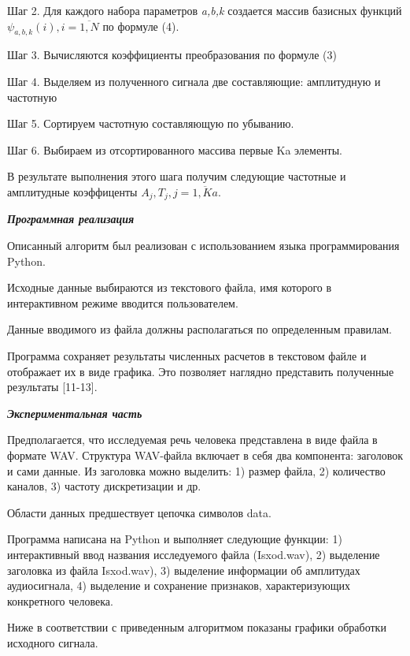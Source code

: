 \begin{multicols}{2}
Шаг 2. Для каждого набора параметров \emph{a,b,k} создается массив
базисных функций $\psi_{a,b,k}(i),i=\overline{1,N}$ по формуле (4).

Шаг 3. Вычисляются коэффициенты преобразования по формуле (3)

Шаг 4. Выделяем из полученного сигнала две составляющие: амплитудную и
частотную

Шаг 5. Сортируем частотную составляющую по убыванию.

Шаг 6. Выбираем из отсортированного массива первые Ka элементы.

В результате выполнения этого шага получим следующие частотные и
амплитудные коэффиценты $A_j, T_j, j = \overline{1, Ka}$.

\emph{{\bfseries Программная реализация}}

Описанный алгоритм был реализован с использованием языка
программирования Python.

Исходные данные выбираются из текстового файла, имя которого в
интерактивном режиме вводится пользователем.

Данные вводимого из файла должны располагаться по определенным правилам.

Программа сохраняет результаты численных расчетов в текстовом файле и
отображает их в виде графика. Это позволяет наглядно представить
полученные результаты {[}11-13{]}.

\emph{{\bfseries Экспериментальная часть}}

Предполагается, что исследуемая речь человека представлена в виде файла
в формате WAV. Структура WAV-файла включает в себя два компонента:
заголовок и сами данные. Из заголовка можно выделить: 1) размер файла,
2) количество каналов, 3) частоту дискретизации и др.

Области данных предшествует цепочка символов data.

Программа написана на Python и выполняет следующие функции: 1)
интерактивный ввод названия исследуемого файла (Isxod.wav), 2) выделение
заголовка из файла Isxod.wav), 3) выделение информации об амплитудах
аудиосигнала, 4) выделение и сохранение признаков, характеризующих
конкретного человека.

Ниже в соответствии с приведенным алгоритмом показаны графики обработки
исходного сигнала.
\end{multicols}


